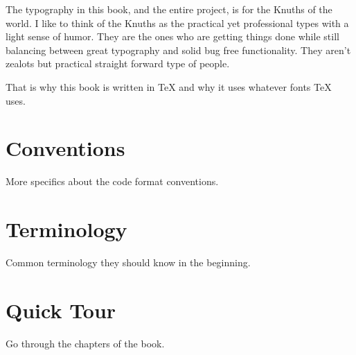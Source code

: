 The typography in this book, and the entire project, is for the Knuths of the
world.  I like to think of the Knuths as the practical yet professional types
with a light sense of humor.  They are the ones who are getting things done
while still balancing between great typography and solid bug free
functionality.  They aren't zealots but practical straight forward type of
people.

That is why this book is written in TeX and why it uses whatever fonts TeX uses.

\section*{Conventions}

More specifics about the code format conventions.

\section*{Terminology}

Common terminology they should know in the beginning.

\section*{Quick Tour}

Go through the chapters of the book.


